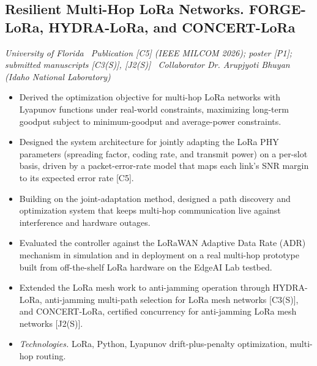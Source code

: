 \documentclass[10pt]{article}
\newcommand{\proj}[2]{\subsection*{#1}{\small\itshape #2}\par}
\newcommand{\tech}[1]{\item \textit{Technologies.} #1}
\begin{document}
\proj{Resilient Multi-Hop LoRa Networks. FORGE-LoRa, HYDRA-LoRa, and CONCERT-LoRa}{University of Florida \textbullet\ Publication [C5] (IEEE MILCOM 2026); poster [P1]; submitted manuscripts [C3(S)], [J2(S)] \textbullet\ Collaborator Dr. Arupjyoti Bhuyan (Idaho National Laboratory)}
\begin{itemize}
\item Derived the optimization objective for multi-hop LoRa networks with Lyapunov functions under real-world constraints, maximizing long-term goodput subject to minimum-goodput and average-power constraints.
\item Designed the system architecture for jointly adapting the LoRa PHY parameters (spreading factor, coding rate, and transmit power) on a per-slot basis, driven by a packet-error-rate model that maps each link's SNR margin to its expected error rate [C5].
\item Building on the joint-adaptation method, designed a path discovery and optimization system that keeps multi-hop communication live against interference and hardware outages.
\item Evaluated the controller against the LoRaWAN Adaptive Data Rate (ADR) mechanism in simulation and in deployment on a real multi-hop prototype built from off-the-shelf LoRa hardware on the EdgeAI Lab testbed.
\item Extended the LoRa mesh work to anti-jamming operation through HYDRA-LoRa, anti-jamming multi-path selection for LoRa mesh networks [C3(S)], and CONCERT-LoRa, certified concurrency for anti-jamming LoRa mesh networks [J2(S)].
\tech{LoRa, Python, Lyapunov drift-plus-penalty optimization, multi-hop routing.}
\end{itemize}
\end{document}
